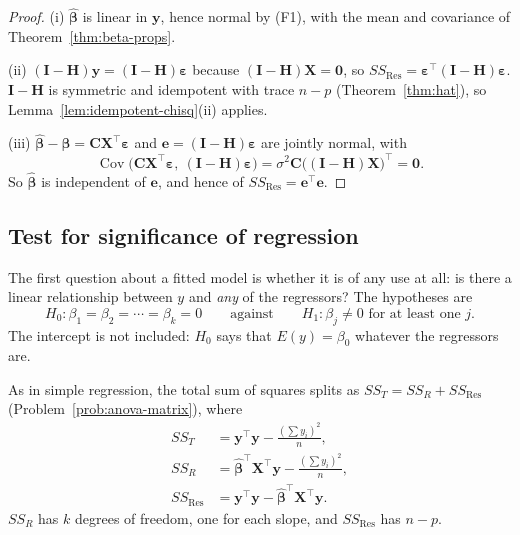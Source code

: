 \documentclass[11pt,a4paper]{article}
\numberwithin{equation}{section}
\theoremstyle{definition}
\begin{document}
\begin{proof}
(i) $\hat{\boldsymbol\beta}$ is linear in $\mathbf{y}$, hence normal by (F1), with the mean
and covariance of Theorem~\ref{thm:beta-props}.

(ii) $(\mathbf{I} - \mathbf{H})\mathbf{y} = (\mathbf{I} - \mathbf{H})\boldsymbol\varepsilon$
because $(\mathbf{I} - \mathbf{H})\mathbf{X} = \mathbf{0}$, so
$SS_{\mathrm{Res}} = \boldsymbol\varepsilon^\top(\mathbf{I} - \mathbf{H})\boldsymbol\varepsilon$.
$\mathbf{I} - \mathbf{H}$ is symmetric and idempotent with trace $n - p$
(Theorem~\ref{thm:hat}), so Lemma~\ref{lem:idempotent-chisq}(ii) applies.

(iii) $\hat{\boldsymbol\beta} - \boldsymbol\beta = \mathbf{C}\mathbf{X}^\top\boldsymbol\varepsilon$
and $\mathbf{e} = (\mathbf{I} - \mathbf{H})\boldsymbol\varepsilon$ are jointly normal, with
\[
\operatorname{Cov}\bigl(\mathbf{C}\mathbf{X}^\top\boldsymbol\varepsilon,\ (\mathbf{I} - \mathbf{H})\boldsymbol\varepsilon\bigr)
= \sigma^2\mathbf{C}\bigl((\mathbf{I} - \mathbf{H})\mathbf{X}\bigr)^\top = \mathbf{0} .
\]
So $\hat{\boldsymbol\beta}$ is independent of $\mathbf{e}$, and hence of
$SS_{\mathrm{Res}} = \mathbf{e}^\top\mathbf{e}$.
\end{proof}

\subsection{Test for significance of regression}
The first question about a fitted model is whether it is of any use at all: is there a
linear relationship between $y$ and \emph{any} of the regressors? The hypotheses are
\[
H_0\colon \beta_1 = \beta_2 = \cdots = \beta_k = 0
\qquad\text{against}\qquad
H_1\colon \beta_j \neq 0 \text{ for at least one } j .
\]
The intercept is not included: $H_0$ says that $E(y) = \beta_0$ whatever the regressors are.

As in simple regression, the total sum of squares splits as
$SS_T = SS_R + SS_{\mathrm{Res}}$ (Problem~\ref{prob:anova-matrix}), where
\begin{align*}
SS_T &= \mathbf{y}^\top\mathbf{y} - \frac{\left(\sum y_i\right)^2}{n}, \\
SS_R &= \hat{\boldsymbol\beta}^\top\mathbf{X}^\top\mathbf{y} - \frac{\left(\sum y_i\right)^2}{n}, \\
SS_{\mathrm{Res}} &= \mathbf{y}^\top\mathbf{y} - \hat{\boldsymbol\beta}^\top\mathbf{X}^\top\mathbf{y} .
\end{align*}
$SS_R$ has $k$ degrees of freedom, one for each slope, and $SS_{\mathrm{Res}}$ has $n - p$.
\end{document}

